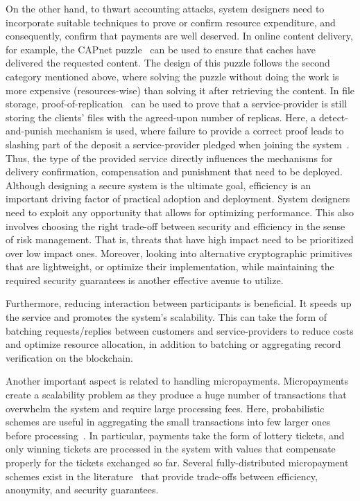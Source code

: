\documentclass{llncs}
\begin{document}
On the other hand, to thwart accounting attacks, system designers need to incorporate suitable techniques to prove or confirm resource expenditure, and consequently, confirm that payments are well deserved. In online content delivery, for example, the CAPnet puzzle~\cite{Almashaqbeh19b} can be used to ensure that caches have delivered the requested content. The design of this puzzle follows the second category mentioned above, where solving the puzzle without doing the work is more expensive (resources-wise) than solving it after retrieving the content. In file storage, proof-of-replication~\cite{Fisch19} can be used to prove that a service-provider is still storing the clients’ files with the agreed-upon number of replicas. Here, a detect-and-punish mechanism is used, where failure to provide a correct proof leads to slashing part of the deposit a service-provider pledged when joining the system~\cite{filecoin}. Thus, the type of the provided service directly influences the mechanisms for delivery confirmation, compensation and punishment that need to be deployed. \\


 Although designing a secure system is the ultimate goal, efficiency is an important driving factor of practical adoption and deployment. System designers need to exploit any opportunity that allows for optimizing performance. This also involves choosing the right trade-off between security and efficiency in the sense of risk management. That is, threats that have high impact need to be prioritized over low impact ones. Moreover, looking into alternative cryptographic primitives that are lightweight, or optimize their implementation, while maintaining the required security guarantees is another effective avenue to utilize.


Furthermore, reducing interaction between participants is beneficial. It speeds up the service and promotes the system’s scalability. This can take the form of batching requests/replies between customers and service-providers to reduce costs and optimize resource allocation, in addition to batching or aggregating record verification on the blockchain.


Another important aspect is related to handling micropayments. Micropayments create a scalability problem as they produce a huge number of transactions that overwhelm the system and require large processing fees. Here, probabilistic schemes are useful in aggregating the small transactions into few larger ones before processing~\cite{Wheeler96,Rivest97}. In particular, payments take the form of lottery tickets, and only winning tickets are processed in the system with values that compensate properly for the tickets exchanged so far. Several fully-distributed micropayment schemes exist in the literature~\cite{Pass15,Chiesa17,Almashaqbeh20} that provide trade-offs between efficiency, anonymity, and security guarantees. \\
\end{document}
